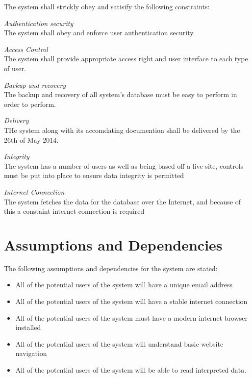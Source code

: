 The system shall strickly obey and satisify the following constraints:


\begin{description}
	\item{\emph{Authentication security}} \hfill \\ The system shall obey and enforce user authentication security.
	\item{\emph{Access Control}} \hfill \\ The system shall provide appropriate access right and user interface to each type of user.
	\item{\emph{Backup and recovery}} \hfill \\ The backup and recovery of all system's database must be easy to perform in order to perform.
	\item{\emph{Delivery}} \hfill \\ THe system along with its accomdating documention shall be delivered by the 26th of May 2014.
	\item{\emph{Integrity}} \hfill \\ The system has a number of users as well as being based off a live site, controls must be put into place to ensure data integrity is permitted
	\item{\emph{Internet Connection}} \hfill \\ The system fetches the data for the database over the Internet, and because of this a constaint internet connection is required
\end{description}

\section{Assumptions and Dependencies}

The following assumptions and dependencies for the system are stated:

\begin{itemize}
	\item All of the potential users of the system will have a unique email address
	\item All of the potential users of the system will have a stable internet connection
	\item All of the potential users of the system must have a modern internet browser installed
	\item All of the potential users of the system will understand basic website navigation
	\item All of the potential users of the system will be able to read interpreted data.
\end{itemize}

